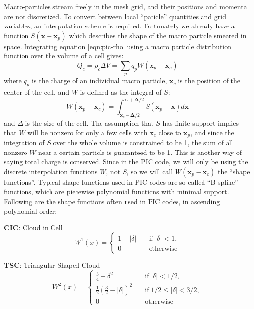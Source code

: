 Macro-particles stream freely in the mesh grid, and their positions and momenta
are not discretized. To convert between local ``paticle'' quantities and grid
variables, an interpolation scheme is required. Fortunately we already have a
function $S(\mathbf{x} - \mathbf{x}_p)$ which describes the shape of the macro
particle smeared in space. Integrating equation \eqref{eqn:pic-rho} using a
macro particle distribution function over the volume of a cell gives:
\begin{equation}
  \label{eqn:rho-cell}
  Q_{c} = \rho_{c}\Delta V = \sum_pq_pW(\mathbf{x}_p-\mathbf{x}_{c})
\end{equation}
where $q_p$ is the charge of an individual macro particle, $\mathbf{x}_{c}$ is
the position of the center of the cell, and $W$ is defined as
the integral of $S$:
\begin{equation}
  \label{eqn:weight-function}
  W(\mathbf{x}_p - \mathbf{x}_c) = \int_{\mathbf{x}_c - \mathbf{\Delta}/2}^{\mathbf{x}_c + \mathbf{\Delta}/2} S(\mathbf{x}_p - \mathbf{x})d\mathbf{x}
\end{equation}
and $\Delta$ is the size of the cell. The assumption that $S$ has finite support
implies that $W$ will be nonzero for only a few cells with $\mathbf{x}_{c}$
close to $\mathbf{x}_{p}$, and since the integration of $S$ over the whole
volume is constrained to be 1, the sum of all nonzero $W$ near a certain
particle is guaranteed to be 1. This is another way of saying total charge is
conserved. Since in the PIC code, we will only be using the discrete
interpolation functions $W$, not $S$, so we will call $W(\mathbf{x}_p -
\mathbf{x}_c)$ the ``shape functions''. Typical shape functions used in PIC
codes are so-called ``B-spline'' functions, which are piecewise polynomial
functions with minimal support. Following are the shape functions often used in
PIC codes, in ascending polynomial order:

\textbf{CIC}: Cloud in Cell
\begin{equation}
    W^1(x) = \begin{cases}
        1 - |\delta| & \quad \text{if } |\delta| < 1, \\
        0            & \quad \text{otherwise}
    \end{cases}
\end{equation}

\textbf{TSC}: Triangular Shaped Cloud
\begin{equation}
    W^2(x) =
    \begin{cases}
        \frac{3}{4} - \delta^2 & \quad \text{if } |\delta| < 1/2, \\
        \frac{1}{2} \left( \frac{3}{2} - |\delta| \right)^2 & \quad \text{if } 1/2 \leq |\delta| < 3/2, \\
        0                      & \quad \text{otherwise}
    \end{cases}
\end{equation}

